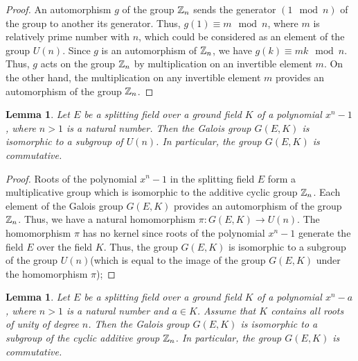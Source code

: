 \documentclass[11pt]{article}
\theoremstyle{plain}
\newtheorem{lemma}[theorem]{Lemma}
\theoremstyle{definition}
\begin{document}
\begin{proof} An automorphism $g$ of the  group $\Bbb Z_n$ sends the generator $(1\mod n)$ of the group to another its generator. Thus, $g(1)\equiv m \mod n$, where $m$ is relatively prime number with $n$, which could be considered as an element of the group $U(n)$. Since $g$ is an automorphism of $\Bbb Z_n$, we have  $g(k)\equiv mk \mod n$. Thus, $g$  acts on the group  $\Bbb Z_n$ by multiplication on an invertible element $m$. On the other hand,  the multiplication on any invertible element $m$  provides an automorphism  of the  group $\Bbb Z_n$.
\end{proof}

\begin{lemma}\label{uroots}  Let $E$ be a splitting field over a ground field $K$ of a polynomial $x^n-1$, where $n>1$  is a natural number. Then the Galois group $G(E,K)$ is isomorphic to a subgroup of  $U(n)$. In particular, the group $G(E,K)$ is commutative.
\end{lemma}

\begin{proof} Roots of the polynomial $x^n-1$ in the splitting field $E$ form a multiplicative group which is isomorphic to the additive cyclic group $\Bbb Z_n$. Each element of the Galois group $G(E,K)$ provides an automorphism of the group $\Bbb Z_n$. Thus, we have a natural homomorphism $\pi:G(E,K)\to U(n)$. The homomorphism $\pi$ has no kernel  since  roots of  the polynomial $x^n-1$ generate the field $E$ over the field $K$.
 Thus, the group $G(E,K)$ is isomorphic to a subgroup of the group $U(n)$(which is equal to the image of the group $G(E,K)$ under the homomorphism $\pi$);
\end{proof}

\begin{lemma}\label{rroot} Let $E$ be a splitting field over a ground field $K$ of a polynomial $x^n-a$, where $n>1$  is a natural number and $a\in K$. Assume that $K$ contains all roots of unity of degree $n$.  Then the Galois group $G(E,K)$ is isomorphic to a subgroup of  the cyclic additive group $\Bbb Z_n$. In particular, the group $G(E,K)$ is commutative.
\end{lemma}
\end{document}
